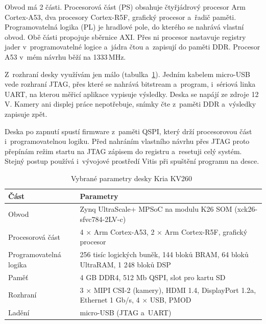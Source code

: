 Obvod má 2 části. Procesorová část (\ac{PS}) obsahuje čtyřjádrový procesor Arm Cortex-A53, dva procesory Cortex-R5F, grafický procesor a~řadič paměti. Programovatelná logika (\ac{PL}) je hradlové pole, do kterého se nahrává vlastní obvod. Obě části propojuje sběrnice \ac{AXI}. Přes ni procesor nastavuje registry jader v~programovatelné logice a~jádra čtou a~zapisují do paměti DDR. Procesor A53 v~mém návrhu běží na 1333\,MHz.

Z~rozhraní desky využívám jen málo (tabulka~\ref{tab:kv260}). Jedním kabelem micro-USB vede rozhraní JTAG, přes které se nahrává bitstream a~program, i~sériová linka UART, na kterou měřicí aplikace vypisuje výsledky. Deska se napájí ze zdroje 12 V. Kamery ani displej práce nepotřebuje, snímky čte z~paměti DDR a~výsledky zapisuje zpět.

Deska po zapnutí spustí firmware z~paměti QSPI, který drží procesorovou část i~programovatelnou logiku. Před nahráním vlastního návrhu přes JTAG proto přepínám režim startu na JTAG zápisem do registru a~resetuji celý systém. Stejný postup používá i~vývojové prostředí Vitis při spuštění programu na desce.

\begin{table}[htbp]
    \centering
    \caption{Vybrané parametry desky Kria KV260~\cite{amd_kv260}}
    \label{tab:kv260}
    \begin{tabular}{p{4.0cm}p{9.5cm}}
        \toprule
        Část & Parametry \\
        \midrule
        Obvod & Zynq UltraScale+ MPSoC na modulu K26 SOM (xck26-sfvc784-2LV-c) \\
        Procesorová část & 4 × Arm Cortex-A53, 2 × Arm Cortex-R5F, grafický procesor \\
        Programovatelná logika & 256 tisíc logických buněk, 144 bloků BRAM, 64 bloků UltraRAM, 1 248 bloků DSP \\
        Paměť & 4 GB DDR4, 512 Mb QSPI, slot pro kartu SD \\
        Rozhraní & 3 × MIPI CSI-2 (kamery), HDMI 1.4, DisplayPort 1.2a, Ethernet 1 Gb/s, 4 × USB, PMOD \\
        Ladění & micro-USB (JTAG a~UART) \\
        \bottomrule
    \end{tabular}
\end{table}


